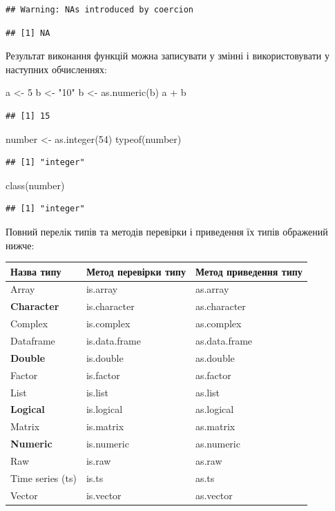 \documentclass[
]{book}
\newenvironment{Shaded}{\begin{snugshade}}{\end{snugshade}}
\newcommand{\DecValTok}[1]{\textcolor[rgb]{0.00,0.00,0.81}{#1}}
\newcommand{\FunctionTok}[1]{\textcolor[rgb]{0.00,0.00,0.00}{#1}}
\newcommand{\NormalTok}[1]{#1}
\newcommand{\OtherTok}[1]{\textcolor[rgb]{0.56,0.35,0.01}{#1}}
\newcommand{\SpecialCharTok}[1]{\textcolor[rgb]{0.00,0.00,0.00}{#1}}
\newcommand{\StringTok}[1]{\textcolor[rgb]{0.31,0.60,0.02}{#1}}
\begin{document}
\begin{verbatim}
## Warning: NAs introduced by coercion
\end{verbatim}

\begin{verbatim}
## [1] NA
\end{verbatim}

Результат виконання функцій можна записувати у змінні і використовувати у наступних обчисленнях:

\begin{Shaded}
\begin{Highlighting}[]
\NormalTok{a }\OtherTok{\textless{}{-}} \DecValTok{5}
\NormalTok{b }\OtherTok{\textless{}{-}} \StringTok{"10"}
\NormalTok{b }\OtherTok{\textless{}{-}} \FunctionTok{as.numeric}\NormalTok{(b)}
\NormalTok{a }\SpecialCharTok{+}\NormalTok{ b}
\end{Highlighting}
\end{Shaded}

\begin{verbatim}
## [1] 15
\end{verbatim}

\begin{Shaded}
\begin{Highlighting}[]
\NormalTok{number }\OtherTok{\textless{}{-}} \FunctionTok{as.integer}\NormalTok{(}\DecValTok{54}\NormalTok{)}
\FunctionTok{typeof}\NormalTok{(number)}
\end{Highlighting}
\end{Shaded}

\begin{verbatim}
## [1] "integer"
\end{verbatim}

\begin{Shaded}
\begin{Highlighting}[]
\FunctionTok{class}\NormalTok{(number)}
\end{Highlighting}
\end{Shaded}

\begin{verbatim}
## [1] "integer"
\end{verbatim}

Повний перелік типів та методів перевірки і приведення їх типів ображений нижче:

\begin{longtable}[]{@{}lll@{}}
\toprule
Назва типу & Метод перевірки типу & Метод приведення типу\tabularnewline
\midrule
\endhead
Array & is.array & as.array\tabularnewline
\textbf{Character} & is.character & as.character\tabularnewline
Complex & is.complex & as.complex\tabularnewline
Dataframe & is.data.frame & as.data.frame\tabularnewline
\textbf{Double} & is.double & as.double\tabularnewline
Factor & is.factor & as.factor\tabularnewline
List & is.list & as.list\tabularnewline
\textbf{Logical} & is.logical & as.logical\tabularnewline
Matrix & is.matrix & as.matrix\tabularnewline
\textbf{Numeric} & is.numeric & as.numeric\tabularnewline
Raw & is.raw & as.raw\tabularnewline
Time series (ts) & is.ts & as.ts\tabularnewline
Vector & is.vector & as.vector\tabularnewline
\bottomrule
\end{longtable}
\end{document}
